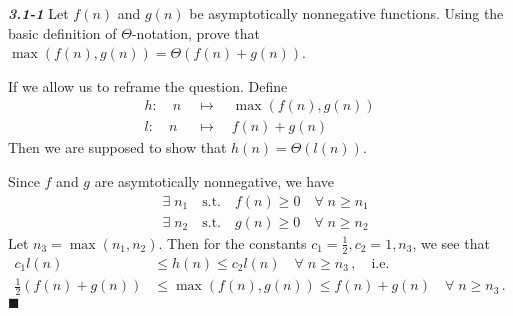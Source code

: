 \documentclass{article}
\begin{document}
\noindent
\textbf{\textsl{3.1-1}}
Let $f(n)$ and $g(n)$ be asymptotically nonnegative functions. Using the basic definition of $\Theta$-notation,
prove that $\max\left(f(n), g(n)\right) = \Theta(f(n) + g(n))$.
\newline
\newline

If we allow us to reframe the question. Define
\begin{align*}
	h \!:\quad n \;&\mapsto\quad \max(f(n), g(n)) \\
	l \!:\quad n \;&\mapsto\quad f(n) + g(n)
\end{align*}
Then we are supposed to show that $h(n) = \Theta(l(n))$.

\noindent
Since $f$ and $g$ are asymtotically nonnegative, we have
\begin{align*}
	& \exists\; n_1 \quad\textrm{s.t.}\quad f(n) \ge 0 \quad\forall\; n \ge n_1 \\
	& \exists\; n_2 \quad\textrm{s.t.}\quad g(n) \ge 0 \quad\forall\; n \ge n_2
\end{align*}
Let $n_3 = \max(n_1, n_2)$. Then for the constants $c_1=\frac{1}{2}, c_2=1, n_3$, we see that
\begin{align*}
	c_1 l(n) &\le h(n) \le c_2 l(n) \quad\forall\; n \ge n_3\,, \quad \textrm{i.e.}\\
	\frac{1}{2}(f(n) + g(n)) &\le \max\left(f(n), g(n)\right) \le f(n) + g(n) \quad\forall\; n \ge n_3\,.
\end{align*}
\hfill$\blacksquare$
\end{document}
